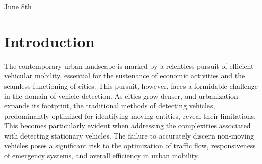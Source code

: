 \documentclass[12pt]{report}
\begin{document}
\begin{titlepage}
		
		{\large June 8th}\\[1cm] %
		
		
		
		
		\vfill %
		
	\end{titlepage}
	
	\setcounter{page}{2}
	\pagestyle{fancy}
	\fancyhf{}
	\rhead{\thepage}
	
	
	\tableofcontents
	\newpage
	\listoffigures
	\newpage
	\listoftables
	
	
	\printglossary[type=acronym,title=List of Abbreviations]
	
	
	
	\chapter{Introduction}
	
	
	
	The contemporary urban landscape is marked by a relentless pursuit of efficient vehicular mobility, essential for the sustenance of economic activities and the seamless functioning of cities. This pursuit, however, faces a formidable challenge in the domain of vehicle detection. As cities grow denser, and urbanization expands its footprint, the traditional methods of detecting vehicles, predominantly optimized for identifying moving entities, reveal their limitations. This becomes particularly evident when addressing the complexities associated with detecting stationary vehicles. The failure to accurately discern non-moving vehicles poses a significant risk to the optimization of traffic flow, responsiveness of emergency systems, and overall efficiency in urban mobility.
	
\end{document}
